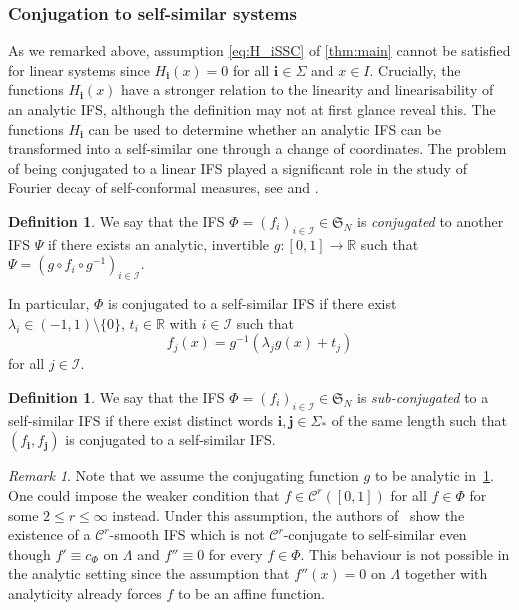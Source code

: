 \documentclass[11pt,a4paper]{article}
\def\cref#1{\ref{#1}}%
\theoremstyle{definition}
\newtheorem{definition}[theorem]{Definition}
\theoremstyle{remark}
\newtheorem{remark}[theorem]{Remark}
\renewcommand{\Bbb}[1]{\mathbb{#1}}
\newcommand{\bbR}{{\Bbb R}}        %
\newcommand{\0}{\mathbf{0}}
\newcommand{\bi}{\mathbf{i}}
\newcommand{\bj}{\mathbf{j}}
\numberwithin{equation}{section}
\begin{document}
\subsubsection{Conjugation to self-similar systems}\label{sec:ConjLinSys}
As we remarked above, assumption \eqref{eq:H_iSSC} of \cref{thm:main} cannot be satisfied for linear
systems since $H_{\bi}(x)=0$ for all $\bi\in \Sigma$ and $x \in I$.  Crucially, the functions
$H_{\bi}(x)$ have a stronger relation to the linearity and linearisability of an analytic IFS,
although the definition may not at first glance reveal this.  The functions $H_{\bi}$ can be used to
determine whether an analytic IFS can be transformed into a
self-similar one through a change of coordinates.
The problem of being conjugated to a linear IFS played a significant role in the study of Fourier
decay of self-conformal measures, see
\cite{AlgomHertzWang23,AlgomEtal_LogFourierDecaySelfConf_JLMS,BakerBanaji_PolyFourierDecay} and \cite[Corollary 1.2 part
3.]{AlgomEtal_PointwiseNormalityFDecaySelfSonf_AdvMath21}.

\begin{definition}\label{def:conjugation}
  We say that the IFS $\Phi = (f_i)_{i\in\mathcal{I}} \in\mathfrak{S}_N$ is 
\emph{conjugated} to another IFS $\Psi$ if there exists an analytic, invertible
  $g:[0,1]\to\bbR$ such that $\Psi=(g\circ f_i\circ g^{-1})_{i\in\mathcal{I}}$. 
\end{definition}
In particular, $\Phi$
  is conjugated to a self-similar IFS if there exist $\lambda_i
\in(-1,1)\setminus\{0\}$, $t_i\in\bbR$ with $i\in\mathcal{I}$ such that
\[
f_{j}(x) = g^{-1}(\lambda_j g(x) + t_j)
\]
for all $j\in\mathcal{I}$.
\begin{definition}
  We say that the IFS $\Phi = (f_i)_{i\in\mathcal{I}} \in\mathfrak{S}_N$ is 
  \emph{sub-conjugated} to a self-similar IFS if there exist distinct words $\bi,\bj\in\Sigma_*$ of
  the same length such that $(f_{\bi},f_{\bj})$ is conjugated to a self-similar IFS.
\end{definition}

\begin{remark}
  Note that we assume the conjugating function $g$ to be analytic in~\cref{def:conjugation}. One could
  impose the weaker condition that $f\in\mathcal{C}^r([0,1])$ for all $f\in\Phi$ for some $2\leq r\leq
  \infty$ instead. Under this assumption, the authors of~\cite{AlgomEtal_NonLinHyperbolicIFS} show the
  existence of a $\mathcal{C}^r$-smooth IFS which is not $\mathcal{C}^r$-conjugate to self-similar
  even though $f'\equiv c_{\Phi}$ on $\Lambda$ and $f''\equiv 0$ for every $f\in\Phi$. This behaviour
  is not possible in the analytic setting since the assumption that $f''(x)=0$ on $\Lambda$ together
  with analyticity already forces $f$ to be an affine function. 
\end{remark}
\end{document}
